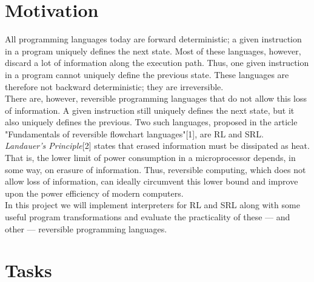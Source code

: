\section{Motivation}
\label{sec:motivation}
All programming languages today are forward deterministic; a given instruction in a program uniquely defines the next state. Most of these languages, however, discard a lot of information along the execution path. Thus, one given instruction in a program cannot uniquely define the previous state. These languages are therefore not backward deterministic; they are irreversible. \\
\indent There are, however, reversible programming languages that do not allow this loss of information. A given instruction still uniquely defines the next state, but it also uniquely defines the previous. Two such languages, proposed in the article "Fundamentals of reversible flowchart languages"[1], are RL and SRL. \\
\indent \textit{Landauer's Principle}[2] states that erased information must be dissipated as heat. That is, the lower limit of power consumption in a microprocessor depends, in some way, on erasure of information. Thus, reversible computing, which does not allow loss of information, can ideally circumvent this lower bound and improve upon the power efficiency of modern computers. \\
\indent In this project we will implement interpreters for RL and SRL along with some useful program transformations and evaluate the practicality of these --- and other --- reversible programming languages.

\section{Tasks}
\label{sec:tasks}

